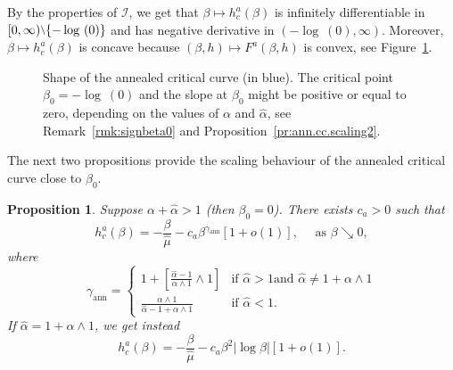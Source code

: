 \documentclass[11pt]{article}
\newtheorem{prop}[theo]{Proposition}
\theoremstyle{definition}
\numberwithin{equation}{section}
\numberwithin{figure}{section}
\numberwithin{table}{section}
\newcommand{\cI}{{\ensuremath{\mathcal I}}}
\newcommand{\ga}{\alpha}
\newcommand{\gb}{\beta}
\newcommand{\ha}{\hat\ga}
\newcommand{\hmu}{\hat \mu}
\newcommand{\gann}{\gamma_{\mathrm{ann}}}
\newcommand{\sm}{{\raise0.3ex\hbox{$\scriptstyle \setminus$}}}
\begin{document}
By the properties of $\cI$, we get that $\gb \mapsto h_c^a(\gb)$ is infinitely differentiable in $[0,\infty) \sm \{- \log~(0)\}$ and has negative derivative in $(- \log~(0),\infty)$. Moreover, $\gb \mapsto h_c^a(\gb)$ is concave because $(\gb,h) \mapsto F^a(\gb,h)$ is convex, see Figure~\ref{fig.ann.cc}.

\begin{figure}
\begin{center}
\end{center}
\caption{\label{fig.ann.cc}
Shape of the annealed critical curve (in blue). The critical point $\gb_0 = -\log~(0)$ and the slope at $\gb_0$ might be positive or equal to zero, depending on the values of $\ga$ and $\hat\ga$, see Remark~\ref{rmk:signbeta0} and Proposition~\ref{pr:ann.cc.scaling2}.}
\end{figure}

The next two propositions provide the scaling behaviour of the annealed critical curve close to $\gb_0$.

\begin{prop}\label{pr:ann.cc.scaling}
Suppose $\ga + \ha > 1$ (then $\gb_0 = 0$). There exists $c_a > 0$ such that
\begin{equation}
h_c^a(\gb) = - \frac{\gb}{\hmu} - c_a \gb^{\gann}[1 + o(1)], \quad \text{ as }\gb \searrow 0,
\end{equation}
where
\begin{equation}\label{eq:defgann}
\gann =
\begin{cases}
1 + \left[\frac{\ha -1}{\ga \wedge 1} \wedge 1 \right] & \text{if } \ha > 1 \text{and } \ha \neq 1 + \ga \wedge 1\\[0.3em]
\frac{\ga \wedge 1}{\ha -1 + \ga \wedge 1} & \text{if } \ha < 1.
\end{cases}
\end{equation}
If $\ha = 1 + \ga \wedge 1$, we get instead
\begin{equation}
h_c^a(\gb) = - \frac{\gb}{\hmu} - c_a \gb^2 |{\log \gb}|[1 + o(1)].
\end{equation}
\end{prop}
\end{document}
